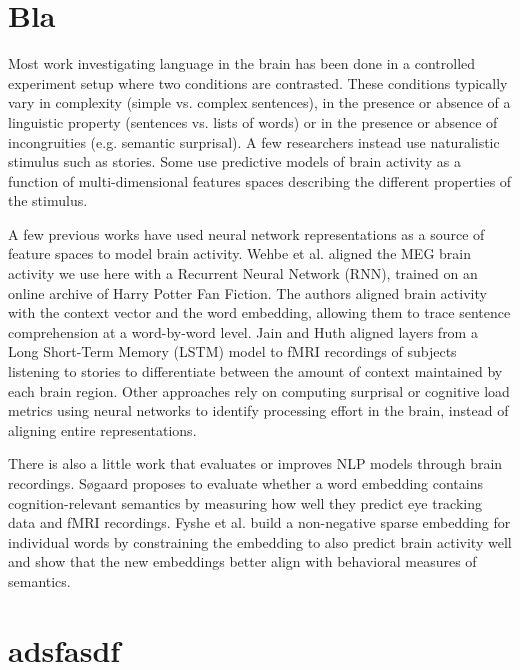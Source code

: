 \documentclass{article}
\begin{document}
\section{Bla}
\label{sec:bla}

Most work investigating language in the brain has been done in a controlled experiment setup where two conditions are contrasted\cite{friederici2011brain}. These conditions typically vary in complexity (simple vs. complex sentences), in the presence or absence of a linguistic property (sentences vs. lists of words) or in the presence or absence of incongruities (e.g. semantic surprisal)\cite{friederici2011brain}. A few researchers instead use naturalistic stimulus such as stories\cite{brennan2012syntactic}. Some use predictive models of brain activity as a function of multi-dimensional features spaces describing the different properties of the stimulus\cite{wehbe2014simultaneously}.

A few previous works have used neural network representations as a source of feature spaces to model brain activity. Wehbe et al.\cite{wehbe2014simultaneously} aligned the MEG brain activity we use here with a Recurrent Neural Network (RNN), trained on an online archive of Harry Potter Fan Fiction. The authors aligned brain activity with the context vector and the word embedding, allowing them to trace sentence comprehension at a word-by-word level. Jain and Huth\cite{jain2018incorporating} aligned layers from a Long Short-Term Memory (LSTM) model to fMRI recordings of subjects listening to stories to differentiate between the amount of context maintained by each brain region. Other approaches rely on computing surprisal or cognitive load metrics using neural networks to identify processing effort in the brain, instead of aligning entire representations\cite{frank2015erp}.

There is also a little work that evaluates or improves NLP models through brain recordings. Søgaard\cite{sogaard2016evaluating} proposes to evaluate whether a word embedding contains cognition-relevant semantics by measuring how well they predict eye tracking data and fMRI recordings. Fyshe et al.\cite{fyshe2014interpretable} build a non-negative sparse embedding for individual words by constraining the embedding to also predict brain activity well and show that the new embeddings better align with behavioral measures of semantics.


\section{adsfasdf}\label{sec:sdafdsda}
\end{document}
